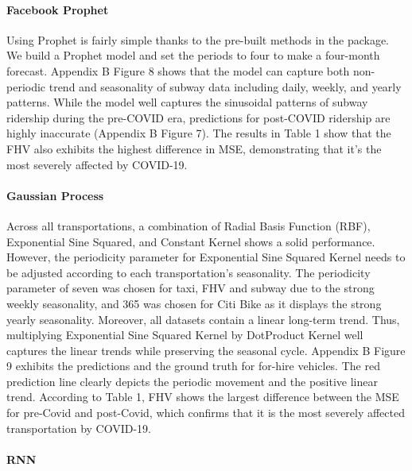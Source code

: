 \documentclass{article}
\begin{document}
\paragraph{Facebook Prophet}

Using Prophet is fairly simple thanks to the pre-built methods in the package. We build a Prophet model and set the periods to four to make a four-month forecast. Appendix B Figure 8 shows that the model can capture both non-periodic trend and seasonality of subway data including daily, weekly, and yearly patterns. While the model well captures the sinusoidal patterns of subway ridership during the pre-COVID era, predictions for post-COVID ridership are highly inaccurate (Appendix B Figure 7). The results in Table 1 show that the FHV also exhibits the highest difference in MSE, demonstrating that it’s the most severely affected by COVID-19.

\paragraph{Gaussian Process}

Across all transportations, a combination of Radial Basis Function (RBF), Exponential Sine Squared, and Constant Kernel shows a solid performance. However, the periodicity parameter for Exponential Sine Squared Kernel needs to be adjusted according to each transportation’s seasonality. The periodicity parameter of seven was chosen for taxi, FHV and subway due to the strong weekly seasonality, and 365 was chosen for Citi Bike as it displays the strong yearly seasonality. Moreover, all datasets contain a linear long-term trend. Thus, multiplying Exponential Sine Squared Kernel by DotProduct Kernel well captures the linear trends while preserving the seasonal cycle. Appendix B Figure 9  exhibits the predictions and the ground truth for for-hire vehicles. The red prediction line clearly depicts the periodic movement and the positive linear trend. According to Table 1, FHV shows the largest difference between the MSE for pre-Covid and post-Covid, which confirms that it is the most severely affected transportation by COVID-19.

\paragraph{RNN}
\end{document}
